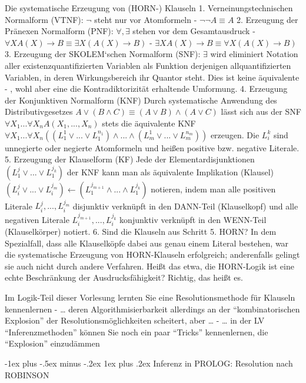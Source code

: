 \documentclass[a4paper]{article}
\makeatletter
\renewcommand{\subsubsection}{\@startsection{subsubsection}{3}{0mm}%
                {-1ex plus -.5ex minus -.2ex}%
                {1ex plus .2ex}%
                {\normalfont\small\bfseries}}
\makeatother
\begin{document}
\begin{multicols}{3}
  Die systematische Erzeugung von (HORN-) Klauseln 1.
  Verneinungstechnischen Normalform (VTNF): $\lnot$ steht nur vor
  Atomformeln - $\lnot\lnot A\equiv A$ 2. Erzeugung der Pränexen
  Normalform (PNF): $\forall, \exists$ stehen vor dem Gesamtausdruck -
  $\forall X A(X) \rightarrow B \equiv \exists X(A(X)\rightarrow B)$ -
  $\exists X A(X) \rightarrow B \equiv \forall X(A(X)\rightarrow B)$ 3.
  Erzeugung der SKOLEM`schen Normalform (SNF): $\exists$ wird eliminiert
  Notation aller existenzquantifizierten Variablen als Funktion derjenigen
  allquantifizierten Variablen, in deren Wirkungsbereich ihr Quantor
  steht. Dies ist keine äquivalente - , wohl aber eine die
  Kontradiktorizität erhaltende Umformung. 4. Erzeugung der Konjunktiven
  Normalform (KNF) Durch systematische Anwendung des Distributivgesetzes
  $A\vee (B\wedge C)\equiv (A\vee B)\wedge(A\vee C)$ lässt sich aus der
  SNF $\forall X_1...\forall X_n A(X_1,...,X_n)$ stets die äquivalente KNF
  $\forall X_1...\forall X_n((L_1^1\vee...\vee L_1^{n_1})\wedge...\wedge(L_m^1\vee...\vee L_m^{n_m}))$
  erzeugen. Die $L_i^k$ sind unnegierte oder negierte Atomformeln und
  heißen positive bzw. negative Literale. 5. Erzeugung der Klauselform
  (KF) Jede der Elementardisjunktionen $(L_1^j \vee...\vee L_1^{j_k})$ der
  KNF kann man als äquivalente Implikation (Klausel)
  $(L_i^j \vee...\vee L_i^{j_m})\leftarrow(L_1^{j_{m+1}}\wedge ...\wedge L_1^{j_k})$
  notieren, indem man alle positiven Literale $L_i^j,...,L_i^{j_m}$
  disjunktiv verknüpft in den DANN-Teil (Klauselkopf) und alle negativen
  Literale $L_i^{j_{m+1}},...,L_i^{j_k}$ konjunktiv verknüpft in den
  WENN-Teil (Klauselkörper) notiert. 6. Sind die Klauseln aus Schritt 5.
  HORN? In dem Spezialfall, dass alle Klauselköpfe dabei aus genau einem
  Literal bestehen, war die systematische Erzeugung von HORN-Klauseln
  erfolgreich; anderenfalls gelingt sie auch nicht durch andere Verfahren.
  Heißt das etwa, die HORN-Logik ist eine echte Beschränkung der
  Ausdrucksfähigkeit? Richtig, das heißt es.

  Im Logik-Teil dieser Vorlesung lernten Sie eine Resolutionsmethode für
  Klauseln kennenlernen - \ldots{} deren Algorithmisierbarkeit allerdings
  an der ``kombinatorischen Explosion'' der Resolutionsmöglichkeiten
  scheitert, aber \ldots{} - \ldots{} in der LV ``Inferenzmethoden''
  können Sie noch ein paar ``Tricks'' kennenlernen, die ``Explosion''
  einzudämmen

  \subsubsection{Inferenz in PROLOG: Resolution nach
    ROBINSON}\label{inferenz-in-prolog-resolution-nach-robinson}


\end{multicols}
\end{document}
